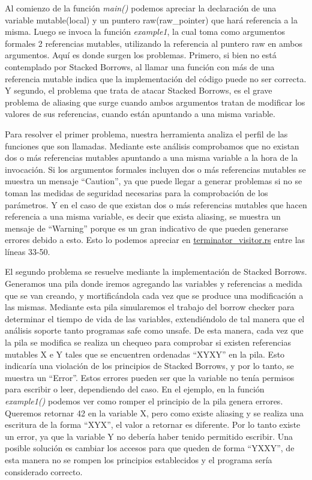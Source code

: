 Al comienzo de la función \textit{main()} podemos apreciar la declaración de una variable mutable(local) y un puntero raw(raw\_pointer) que hará referencia a la misma. Luego se invoca la función \textit{example1}, la cual toma como argumentos formales 2 referencias mutables, utilizando la referencia al puntero raw en ambos argumentos. Aquí es donde surgen los problemas. Primero, si bien no está contemplado por Stacked Borrows, al llamar una función con más de una referencia mutable indica que la implementación del código puede no ser correcta. Y segundo, el problema que trata de atacar Stacked Borrows, es el grave problema de aliasing que surge cuando ambos argumentos tratan de modificar los valores de sus referencias, cuando están apuntando a una misma variable.

Para resolver el primer problema, nuestra herramienta analiza el perfil de las funciones que son llamadas. Mediante este análisis comprobamos que no existan dos o más referencias mutables apuntando a una misma variable a la hora de la invocación. Si los argumentos formales incluyen dos o más referencias mutables se muestra un mensaje ``Caution”, ya que puede llegar a generar problemas si no se toman las medidas de seguridad necesarias para la comprobación de los parámetros. Y en el caso de que existan dos o más referencias mutables que hacen referencia a una misma variable, es decir que exista aliasing, se muestra un mensaje de ``Warning'' porque es un gran indicativo de que pueden generarse errores debido a esto. Esto lo podemos apreciar en \href{run:../src/mir_visitor/terminator_visitor.rs}{terminator\_visitor.rs} entre las líneas 33-50.

El segundo problema se resuelve mediante la implementación de Stacked Borrows. Generamos una pila donde iremos agregando las variables y referencias a medida que se van creando, y mortificándola cada vez que se produce una modificación a las mismas. Mediante esta pila simularemos el trabajo del borrow checker para determinar el tiempo de vida de las variables, extendiéndolo de tal manera que el análisis soporte tanto programas safe como unsafe.
De esta manera, cada vez que la pila se modifica se realiza un chequeo para comprobar si existen referencias mutables X e Y tales que se encuentren ordenadas ``XYXY'' en la pila. Esto indicaría una violación de los principios de Stacked Borrows, y por lo tanto, se muestra un ``Error''. Estos errores pueden ser que la variable no tenía permisos para escribir o leer, dependiendo del caso. En el ejemplo, en la función \textit{example1()} podemos ver como romper el principio de la pila genera errores. Queremos retornar 42 en la variable X, pero como existe aliasing y se realiza una escritura de la forma ``XYX'', el valor a retornar es diferente. Por lo tanto existe un error, ya que la variable Y no debería haber tenido permitido escribir. Una posible solución es cambiar los accesos para que queden de forma ``YXXY'', de esta manera no se rompen los principios establecidos y el programa sería considerado correcto.

